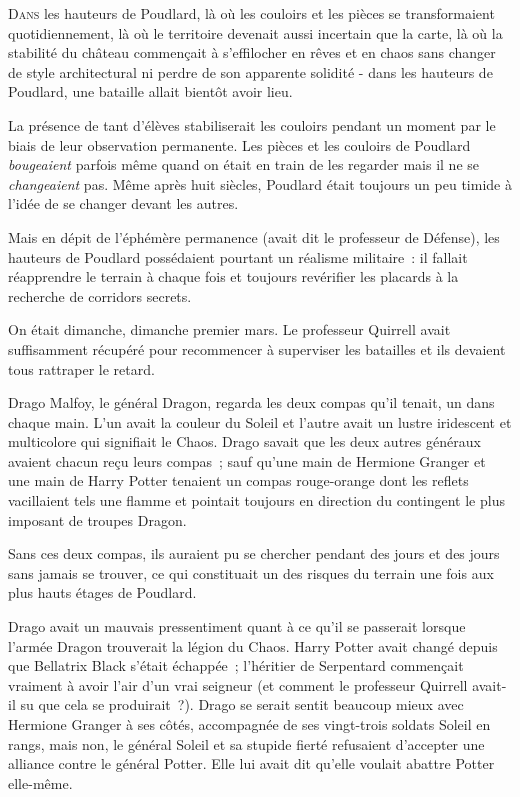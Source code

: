 
\lettrine{D}{ans} les hauteurs de Poudlard, là où les couloirs et les pièces se transformaient quotidiennement, là où le territoire devenait aussi incertain que la carte, là où la stabilité du château commençait à s'effilocher en rêves et en chaos sans changer de style architectural ni perdre de son apparente solidité - dans les hauteurs de Poudlard, une bataille allait bientôt avoir lieu.

La présence de tant d'élèves stabiliserait les couloirs pendant un moment par le biais de leur observation permanente. Les pièces et les couloirs de Poudlard \emph{bougeaient} parfois même quand on était en train de les regarder mais il ne se \emph{changeaient} pas. Même après huit siècles, Poudlard était toujours un peu timide à l'idée de se changer devant les autres.

Mais en dépit de l'éphémère permanence (avait dit le professeur de Défense), les hauteurs de Poudlard possédaient pourtant un réalisme militaire~: il fallait réapprendre le terrain à chaque fois et toujours revérifier les placards à la recherche de corridors secrets.

On était dimanche, dimanche premier mars. Le professeur Quirrell avait suffisamment récupéré pour recommencer à superviser les batailles et ils devaient tous rattraper le retard.

Drago Malfoy, le général Dragon, regarda les deux compas qu'il tenait, un dans chaque main. L'un avait la couleur du Soleil et l'autre avait un lustre iridescent et multicolore qui signifiait le Chaos. Drago savait que les deux autres généraux avaient chacun reçu leurs compas~; sauf qu'une main de Hermione Granger et une main de Harry Potter tenaient un compas rouge-orange dont les reflets vacillaient tels une flamme et pointait toujours en direction du contingent le plus imposant de troupes Dragon.

Sans ces deux compas, ils auraient pu se chercher pendant des jours et des jours sans jamais se trouver, ce qui constituait un des risques du terrain une fois aux plus hauts étages de Poudlard.

Drago avait un mauvais pressentiment quant à ce qu'il se passerait lorsque l'armée Dragon trouverait la légion du Chaos. Harry Potter avait changé depuis que Bellatrix Black s'était échappée~; l'héritier de Serpentard commençait vraiment à avoir l'air d'un vrai seigneur (et comment le professeur Quirrell avait-il su que cela se produirait~?). Drago se serait sentit beaucoup mieux avec Hermione Granger à ses côtés, accompagnée de ses vingt-trois soldats Soleil en rangs, mais non, le général Soleil et sa stupide fierté refusaient d'accepter une alliance contre le général Potter. Elle lui avait dit qu'elle voulait abattre Potter elle-même.

